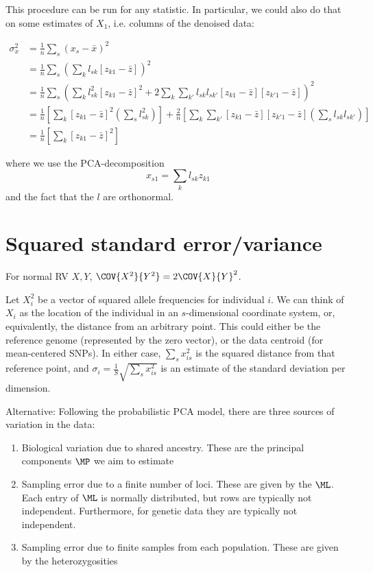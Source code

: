 \documentclass[12pt, letterpaper]{article}
\begin{document}
This procedure can be run for any statistic. In particular, we could also do that on some estimates of $X_1$, i.e. columns of the denoised data:

\begin{align}
    \sigma^2_{x} &= \frac{1}{n} \sum_s (x_{s} -\bar{x})^2  \\
    &= \frac{1}{n} \sum_s \left( \sum_k  l_{sk} [z_{k1} - \bar{z}] \right)^2\\
    &= \frac{1}{n} \sum_s \left( \sum_k  l_{sk}^2 [z_{k1} - \bar{z}]^2 + 2\sum_k\sum_{k'}  l_{sk}l_{sk'} [z_{k1} - \bar{z}][z_{k'1} - \bar{z}] \right)^2\\  
    &= \frac{1}{n} \left [ \sum_k [z_{k1} - \bar{z}]^2 \left( \sum_s  l_{sk}^2\right)\right]  + \frac{2}{n} \left[ \sum_k\sum_{k'}  [z_{k1} - \bar{z}][z_{k'1} - \bar{z}] \left( \sum_s  l_{sk}l_{sk'}\right)\right ]  \\
    &= \frac{1}{n} \left [ \sum_k [z_{k1} - \bar{z}]^2 \right]
\end{align}

where we use the PCA-decomposition
\begin{equation}
    x_{s1} = \sum_k l_{sk} z_{k1}
\end{equation}
and the fact that the $l$ are orthonormal.

\section{Squared standard error/variance}
For  normal RV $X,Y$, $\COV{X^2}{Y^2} = 2 \COV{X}{Y}^2$.

Let $X_i^2$ be a vector of squared allele frequencies for individual $i$. We can think of $X_i$ as the location of the individual in an $s$-dimensional coordinate system, or, equivalently, the distance from an arbitrary point. This could either be the reference genome (represented by the zero vector), or the data centroid (for mean-centered SNPs). In either case, $ \sum_s x_{is}^2$ is the squared distance from that reference point, and $\sigma_i = \frac{1}{S} \sqrt{\sum_s x_{is}^2}$ is an estimate of the standard deviation per dimension. 


Alternative: Following the probabilistic PCA model, there are three sources of variation in the data:
\begin{enumerate}
    \item Biological variation due to shared ancestry. These are the principal components $\MP$ we aim to estimate
    \item Sampling error due to a finite number of loci. These are given by the $\ML$. Each entry of $\ML$ is normally distributed, but rows are typically not independent. Furthermore, for genetic data they are typically not independent.
    \item Sampling error due to finite samples from each population. These are given by the heterozygosities
\end{enumerate}
\end{document}
